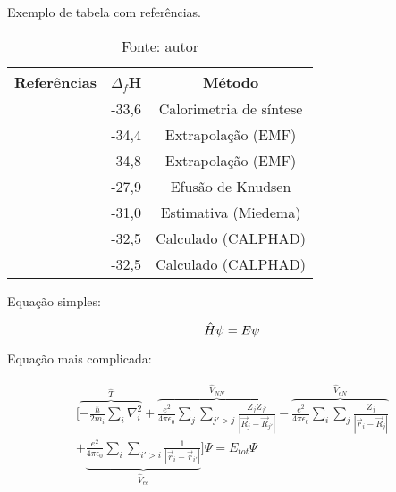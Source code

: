 \begin{table}
	\centering
	\caption{Exemplo de tabela com referências.}
	\begin{tabular}{ccc}
		\toprule
		Referências & $\Delta_f$H & Método\\
		\midrule
		\cite{Kleppa1998} & -33,6 & Calorimetria de síntese\\
		\cite{Eremenko1972} & -34,4 & Extrapolação (EMF)\\
		\cite{Lukashenko1986} & -34,8 & Extrapolação (EMF)\\
		\cite{Chart1975} & -27,9 & Efusão de Knudsen\\
		\cite{deBoer1982} & -31,0 & Estimativa (Miedema)\\
		\cite{Coughanowr1994} & -32,5 & Calculado (CALPHAD)\\
		\cite{Schuster2000} & -32,5 & Calculado (CALPHAD)\\
		\bottomrule
		
	\end{tabular}
	\label{tab:T1-entalpias}
	\caption*{Fonte: autor}
\end{table}

Equação simples:

\begin{equation}
\centering
\hat{H}\psi=E\psi
\label{Schro}
\end{equation}

Equação mais complicada:

\begin{multline}
\bigg[\overbrace{-\frac{\hbar}{2m_{i}}\sum_i\nabla_i^2}^{\hat{T}} +\overbrace{\frac{e^2}{4\pi\epsilon_0}\sum_j\sum_{j'>j}\frac{Z_jZ_{j'}}{|\vec{R}_j-\vec{R}_{j'}|}}^{\hat{V}_{NN}} -\overbrace{\frac{e^2}{4\pi\epsilon_0}\sum_i\sum_{j}\frac{Z_j}{|\vec{r}_i-\vec{R}_{j}|}}^{\hat{V}_{eN}} \\ +\underbrace{\frac{e^2}{4\pi\epsilon_0}\sum_i\sum_{i'>i}\frac{1}{|\vec{r}_i-\vec{r}_{i'}|}}_{\hat{V}_{ee}}\bigg]\Psi = E_{tot}\Psi
\end{multline}

